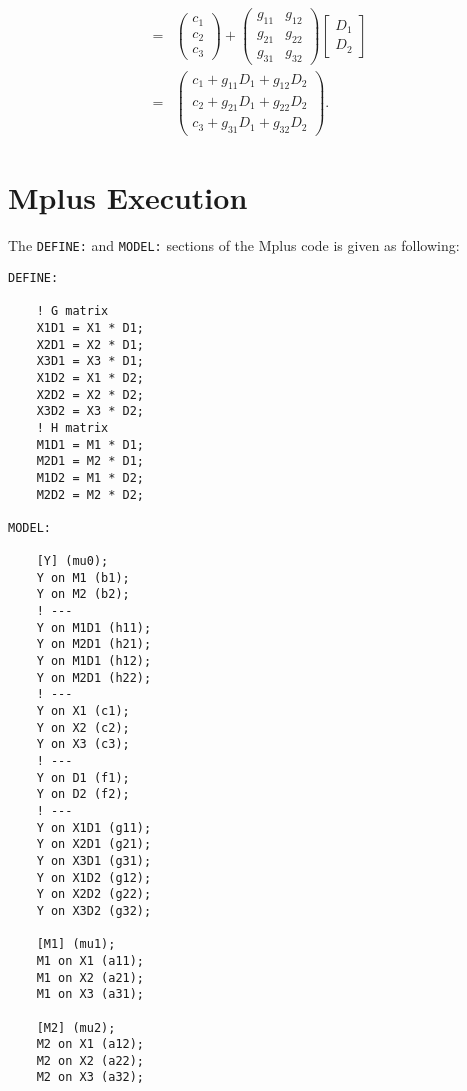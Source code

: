 \begin{equation*}
\begin{aligned}
        = &\begin{pmatrix}
            c_1\\
            c_2\\
            c_3
        \end{pmatrix} +
        \begin{pmatrix}
            g_{11}  &g_{12}\\
            g_{21}  &g_{22}\\
            g_{31}  &g_{32}
        \end{pmatrix}
        \begin{bmatrix}
            D_1\\
            D_2
        \end{bmatrix}\\
        = &\begin{pmatrix}
            c_1 + g_{11}D_1 + g_{12}D_2\\
            c_2 + g_{21}D_1 + g_{22}D_2\\
            c_3 + g_{31}D_1 + g_{32}D_2
        \end{pmatrix}.
    \end{aligned}
\end{equation*}

\section{Mplus Execution}

The \texttt{DEFINE:} and \texttt{MODEL:} sections of the Mplus code is given as following:

\begin{singlespace}\tiny
    \begin{lstlisting}
DEFINE:

    ! G matrix
    X1D1 = X1 * D1;
    X2D1 = X2 * D1;
    X3D1 = X3 * D1;
    X1D2 = X1 * D2;
    X2D2 = X2 * D2;
    X3D2 = X3 * D2;
    ! H matrix
    M1D1 = M1 * D1;
    M2D1 = M2 * D1;
    M1D2 = M1 * D2;
    M2D2 = M2 * D2;

MODEL:

    [Y] (mu0);
    Y on M1 (b1);
    Y on M2 (b2);
    ! ---
    Y on M1D1 (h11);
    Y on M2D1 (h21);
    Y on M1D1 (h12);
    Y on M2D1 (h22);
    ! ---
    Y on X1 (c1);
    Y on X2 (c2);
    Y on X3 (c3);
    ! ---
    Y on D1 (f1);
    Y on D2 (f2);
    ! ---
    Y on X1D1 (g11);
    Y on X2D1 (g21);
    Y on X3D1 (g31);
    Y on X1D2 (g12);
    Y on X2D2 (g22);
    Y on X3D2 (g32);

    [M1] (mu1);
    M1 on X1 (a11);
    M1 on X2 (a21);
    M1 on X3 (a31);

    [M2] (mu2);
    M2 on X1 (a12);
    M2 on X2 (a22);
    M2 on X3 (a32);
    \end{lstlisting}
\end{singlespace}


